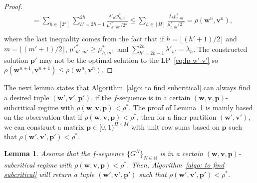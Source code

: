 \documentclass[11pt, reqno]{article}
\newtheorem{lemma}[theorem]{Lemma}
\numberwithin{equation}{section}
\numberwithin{theorem}{section}
\newcommand{\N}{\mathbb{N}}                 %
\begin{document}
\begin{proof}
\begin{equation*}
\begin{split}
            &=\sum_{h\in[2^n]}\sum_{h'=2h-1}^{2h}\frac{\lambda'_{h'}p^*_{h,m}}{\mu'^*_{h',m'}/2^{n}}\leq \sum_{h\in[H]}\frac{\lambda_{h}p^*_{h,m}}{\mu^*_{h,m}/2^{n}}= \rho(\mathbf{w}^n,\mathbf{v}^n), \\
        \end{split}
    \end{equation*}
where the last inequality comes from the fact that if $h=\lfloor (h'+1)/2\rfloor$ and $m=\lfloor (m'+1)/2\rfloor$,
$ \mu'^*_{h',m'}\geq \mu^*_{h,m},$
and $\sum_{h'=2h-1}^{2h} \lambda'_{h'}=\lambda_h$.
The constructed solution $\mathbf{p}'$ may not be the optimal solution to the LP~\eqref{eq:lp-w'-v'} so $\rho(\mathbf{w}^{n+1},\mathbf{v}^{n+1})\leq\rho(\mathbf{w}^n,\mathbf{v}^n)$.
\end{proof}

The next lemma states that Algorithm~\ref{algo: to find subcritical} can always find a desired tuple $(\mathbf{w}',\mathbf{v}',\mathbf{p}')$, if the $f$-sequence is in a certain $(\mathbf{w},\mathbf{v},\mathbf{p})$-subcritical regime with $\rho(\mathbf{w},\mathbf{v},\mathbf{p})< \rho^*$. The proof of Lemma~\ref{lem:find-subcritical} is mainly based on the observation that if $\rho(\mathbf{w},\mathbf{v},\mathbf{p})<\rho^*$, then for a finer partition $(\mathbf{w}',\mathbf{v}')$, we can construct a matrix $\mathbf{p}\in[0,1)^{H\times M}$ with unit row sums based on $\mathbf{p}$ such that $\rho(\mathbf{w}',\mathbf{v}',\mathbf{p}')<\rho^*$.
\begin{lemma}\label{lem:find-subcritical}
Assume that the $f$-sequence $\{G^N\}_{N\in\N}$ is in a certain $(\mathbf{w},\mathbf{v},\mathbf{p})$-subcritical regime with $\rho(\mathbf{w},\mathbf{v},\mathbf{p})< \rho^*$. Then, Algorithm~\ref{algo: to find subcritical} will return a tuple $(\mathbf{w}',\mathbf{v}',\mathbf{p}')$ such that $\rho(\mathbf{w}',\mathbf{v}',\mathbf{p}')<\rho^*$. 
\end{lemma}
 
\end{document}
